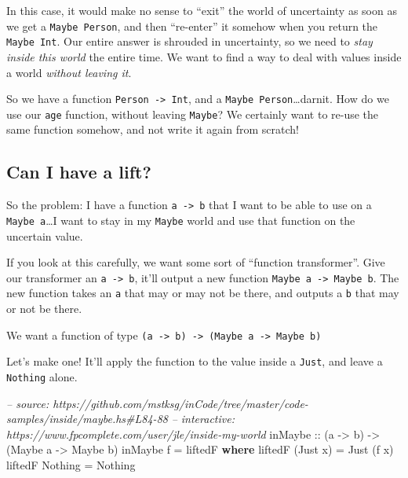 \documentclass[]{article}
\newenvironment{Shaded}{}{}
\newcommand{\KeywordTok}[1]{\textcolor[rgb]{0.00,0.44,0.13}{\textbf{{#1}}}}
\newcommand{\DataTypeTok}[1]{\textcolor[rgb]{0.56,0.13,0.00}{{#1}}}
\newcommand{\CommentTok}[1]{\textcolor[rgb]{0.38,0.63,0.69}{\textit{{#1}}}}
\newcommand{\OtherTok}[1]{\textcolor[rgb]{0.00,0.44,0.13}{{#1}}}
\newcommand{\FunctionTok}[1]{\textcolor[rgb]{0.02,0.16,0.49}{{#1}}}
\newcommand{\NormalTok}[1]{{#1}}
\begin{document}
In this case, it would make no sense to ``exit'' the world of
uncertainty as soon as we get a \texttt{Maybe\ Person}, and then
``re-enter'' it somehow when you return the \texttt{Maybe\ Int}. Our
entire answer is shrouded in uncertainty, so we need to \emph{stay
inside this world} the entire time. We want to find a way to deal with
values inside a world \emph{without leaving it}.

So we have a function \texttt{Person\ -\textgreater{}\ Int}, and a
\texttt{Maybe\ Person}\ldots{}darnit. How do we use our \texttt{age}
function, without leaving \texttt{Maybe}? We certainly want to re-use
the same function somehow, and not write it again from scratch!

\subsection{Can I have a lift?}\label{can-i-have-a-lift}

So the problem: I have a function \texttt{a\ -\textgreater{}\ b} that I
want to be able to use on a \texttt{Maybe\ a}\ldots{}I want to stay in
my \texttt{Maybe} world and use that function on the uncertain value.

If you look at this carefully, we want some sort of ``function
transformer''. Give our transformer an \texttt{a\ -\textgreater{}\ b},
it'll output a new function
\texttt{Maybe\ a\ -\textgreater{}\ Maybe\ b}. The new function takes an
\texttt{a} that may or may not be there, and outputs a \texttt{b} that
may or not be there.

We want a function of type
\texttt{(a\ -\textgreater{}\ b)\ -\textgreater{}\ (Maybe\ a\ -\textgreater{}\ Maybe\ b)}

Let's make one! It'll apply the function to the value inside a
\texttt{Just}, and leave a \texttt{Nothing} alone.

\begin{Shaded}
\begin{Highlighting}[]
\CommentTok{-- source: https://github.com/mstksg/inCode/tree/master/code-samples/inside/maybe.hs#L84-88}
\CommentTok{-- interactive: https://www.fpcomplete.com/user/jle/inside-my-world}
\OtherTok{inMaybe ::} \NormalTok{(a }\OtherTok{->} \NormalTok{b) }\OtherTok{->} \NormalTok{(}\DataTypeTok{Maybe} \NormalTok{a }\OtherTok{->} \DataTypeTok{Maybe} \NormalTok{b)}
\NormalTok{inMaybe f }\FunctionTok{=} \NormalTok{liftedF}
  \KeywordTok{where}
    \NormalTok{liftedF (}\DataTypeTok{Just} \NormalTok{x) }\FunctionTok{=} \DataTypeTok{Just} \NormalTok{(f x)}
    \NormalTok{liftedF }\DataTypeTok{Nothing}  \FunctionTok{=} \DataTypeTok{Nothing}
\end{Highlighting}
\end{Shaded}
\end{document}

